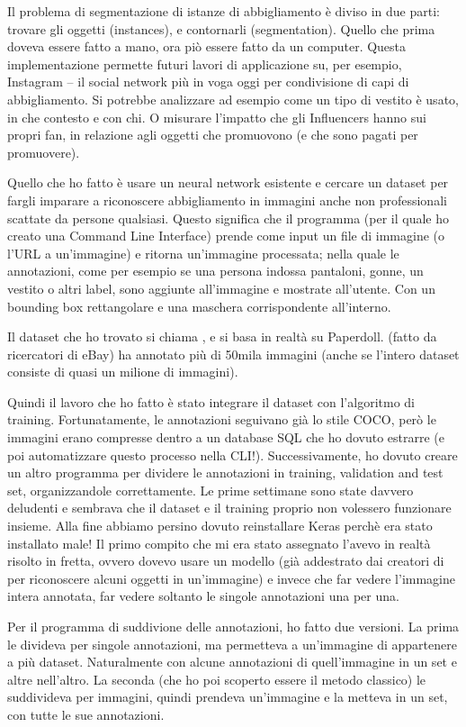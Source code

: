 Il problema di segmentazione di istanze di abbigliamento è diviso in due parti: trovare gli oggetti (instances), e contornarli (segmentation). Quello che prima doveva essere fatto a mano, ora piò essere fatto da un computer. Questa implementazione permette futuri lavori di applicazione su, per esempio, Instagram -- il social network più in voga oggi per condivisione di capi di abbigliamento. Si potrebbe analizzare ad esempio come un tipo di vestito è usato, in che contesto e con chi. O misurare l'impatto che gli Influencers hanno sui propri fan, in relazione agli oggetti che promuovono (e che sono pagati per promuovere).

Quello che ho fatto è usare un neural network esistente e cercare un dataset per fargli imparare a riconoscere abbigliamento in immagini anche non professionali scattate da persone qualsiasi. Questo significa che il programma (per il quale ho creato una Command Line Interface) prende come input un file di immagine (o l'URL a un'immagine) e ritorna un'immagine processata; nella quale le annotazioni, come per esempio se una persona indossa pantaloni, gonne, un vestito o altri label, sono aggiunte all'immagine e mostrate all'utente. Con un bounding box rettangolare e una maschera corrispondente all'interno.

Il dataset che ho trovato si chiama \modanet, e si basa in realtà su Paperdoll.
\modanet (fatto da ricercatori di eBay) ha annotato più di 50mila immagini (anche se l'intero dataset consiste di quasi un milione di immagini).

Quindi il lavoro che ho fatto è stato integrare il dataset con l'algoritmo di training. Fortunatamente, le annotazioni \modanet seguivano già lo stile COCO, però le immagini erano compresse dentro a un database SQL che ho dovuto estrarre (e poi automatizzare questo processo nella CLI!). Successivamente, ho dovuto creare un altro programma per dividere le annotazioni in training, validation and test set, organizzandole correttamente.
Le prime settimane sono state davvero deludenti e sembrava che il dataset e il training proprio non volessero funzionare insieme. Alla fine abbiamo persino dovuto reinstallare Keras perchè era stato installato male! Il primo compito che mi era stato assegnato l'avevo in realtà risolto in fretta, ovvero dovevo usare un modello (già addestrato dai creatori di \maskrcnn per riconoscere alcuni oggetti in un'immagine) e invece che far vedere l'immagine intera annotata, far vedere soltanto le singole annotazioni una per una.

Per il programma di suddivione delle annotazioni, ho fatto due versioni. La prima le divideva per singole annotazioni, ma permetteva a un'immagine di appartenere a più dataset. Naturalmente con alcune annotazioni di quell'immagine in un set e altre nell'altro. La seconda (che ho poi scoperto essere il metodo classico) le suddivideva per immagini, quindi prendeva un'immagine e la metteva in un set, con tutte le sue annotazioni.

